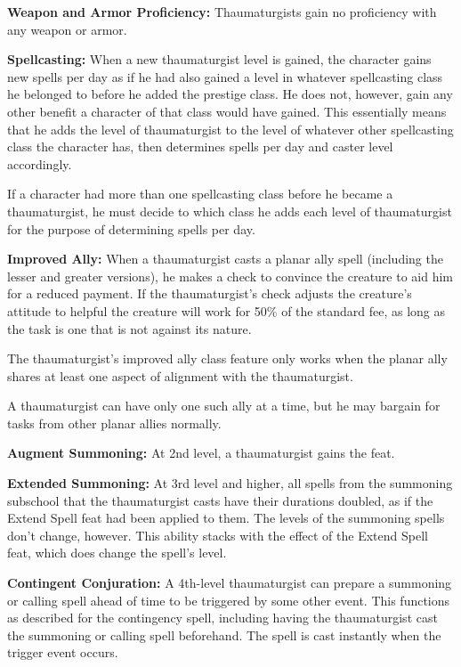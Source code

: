 {
\textbf{Weapon and Armor Proficiency:} Thaumaturgists gain no proficiency with any weapon or armor.

\textbf{Spellcasting:} When a new thaumaturgist level is gained, the character gains new spells per day as if he had also gained a level in whatever spellcasting class he belonged to before he added the prestige class. He does not, however, gain any other benefit a character of that class would have gained. This essentially means that he adds the level of thaumaturgist to the level of whatever other spellcasting class the character has, then determines spells per day and caster level accordingly.

If a character had more than one spellcasting class before he became a thaumaturgist, he must decide to which class he adds each level of thaumaturgist for the purpose of determining spells per day.

\textbf{Improved Ally:} When a thaumaturgist casts a planar ally spell (including the lesser and greater versions), he makes a  check to convince the creature to aid him for a reduced payment. If the thaumaturgist's  check adjusts the creature's attitude to helpful the creature will work for 50\% of the standard fee, as long as the task is one that is not against its nature.

The thaumaturgist's improved ally class feature only works when the planar ally shares at least one aspect of alignment with the thaumaturgist.

A thaumaturgist can have only one such ally at a time, but he may bargain for tasks from other planar allies normally.

\textbf{Augment Summoning:} At 2nd level, a thaumaturgist gains the  feat.

\textbf{Extended Summoning:} At 3rd level and higher, all spells from the summoning subschool that the thaumaturgist casts have their durations doubled, as if the Extend Spell feat had been applied to them. The levels of the summoning spells don't change, however. This ability stacks with the effect of the Extend Spell feat, which does change the spell's level.

\textbf{Contingent Conjuration:} A 4th-level thaumaturgist can prepare a summoning or calling spell ahead of time to be triggered by some other event. This functions as described for the contingency spell, including having the thaumaturgist cast the summoning or calling spell beforehand. The spell is cast instantly when the trigger event occurs.

}
